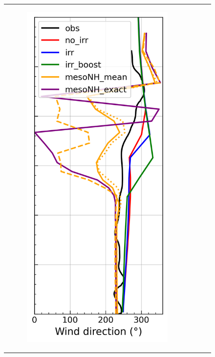 \begin{figure}[hbtp]
{\begin{tabular}{@{}cccc@{}}
\begin{subfigure}[t]{0.283\textwidth}
            \caption{}
            \includegraphics[width=\textwidth]{images/chap5/profiles/profile_cendrosa_wind_direction_1507_sensbins.png}

\end{subfigure}
\end{tabular}}
\end{figure}
